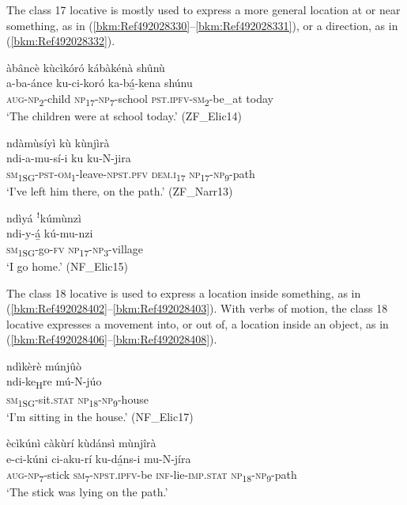 The class 17 locative is mostly used to express a more general location at or near something, as in (\ref{bkm:Ref492028330}--\ref{bkm:Ref492028331}), or a direction, as in (\ref{bkm:Ref492028332}).

\ea
\label{bkm:Ref492028330}
àbâncè kùcìkóró kábàkénà shûnù\\
\gll a-ba-ánce    ku-ci-koró    ka-bá̲-kena    shúnu\\
\textsc{aug}-\textsc{np}\textsubscript{2}-child  \textsc{np}\textsubscript{17}-\textsc{np}\textsubscript{7}-school  \textsc{pst}.\textsc{ipfv}-\textsc{sm}\textsubscript{2}-be\_at  today\\
\glt ‘The children were at school today.’ (ZF\_Elic14)
\z

\ea
\label{bkm:Ref492028331}
ndàmùsíyì kù kùnjìrà\\
\gll ndi-a-mu-sí-i      ku    ku-N-jira\\
\textsc{sm}\textsubscript{1SG}-\textsc{pst}-\textsc{om}\textsubscript{1}-leave-\textsc{npst}.\textsc{pfv}  \textsc{dem}.\textsc{i}\textsubscript{17}  \textsc{np}\textsubscript{17}-\textsc{np}\textsubscript{9}-path\\
\glt ‘I’ve left him there, on the path.’ (ZF\_Narr13)
\z

\ea
\label{bkm:Ref492028332}
ndìyá ꜝkúmùnzì\\
\gll ndi-y-á̲  kú-mu-nzi\\
\textsc{sm}\textsubscript{1SG}-go-\textsc{fv}  \textsc{np}\textsubscript{17}-\textsc{np}\textsubscript{3}-village\\
\glt ‘I go home.’ (NF\_Elic15)
\z

The class 18 locative is used to express a location inside something, as in (\ref{bkm:Ref492028402}--\ref{bkm:Ref492028403}). With verbs of motion, the class 18 locative expresses a movement into, or out of, a location inside an object, as in (\ref{bkm:Ref492028406}--\ref{bkm:Ref492028408}).

\ea
\label{bkm:Ref492028402}
ndìkèrè múnjûò\\
\gll ndi-ke\textsubscript{H}re    mú-N-júo\\
\textsc{sm}\textsubscript{1SG}-sit.\textsc{stat}  \textsc{np}\textsubscript{18}-\textsc{np}\textsubscript{9}-house\\
\glt ‘I’m sitting in the house.’ (NF\_Elic17)
\z

\ea
\label{bkm:Ref492028403}
ècìkúnì càkùrí kùdánsì mùnjîrà\\
\gll e-ci-kúni    ci-aku-rí    ku-dá̲ns-i    mu-N-jíra\\
\textsc{aug}-\textsc{np}\textsubscript{7}-stick  \textsc{sm}\textsubscript{7}-\textsc{npst}.\textsc{ipfv}-be  \textsc{inf}-lie-\textsc{imp}.\textsc{stat}  \textsc{np}\textsubscript{18}-\textsc{np}\textsubscript{9}-path\\
\glt ‘The stick was lying on the path.’
\z

